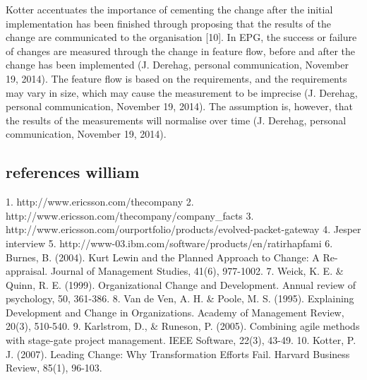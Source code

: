 \documentclass[final_report_innit.tex]{subfiles}
\begin{document}
Kotter accentuates the importance of cementing the change after the initial implementation has been finished through proposing that the results of the change are communicated to the organisation [10]. In EPG, the success or failure of changes are measured through the change in feature flow, before and after the change has been implemented (J. Derehag, personal communication, November 19, 2014). The feature flow is based on the requirements, and the requirements may vary in size, which may cause the measurement to be imprecise (J. Derehag, personal communication, November 19, 2014). The assumption is, however, that the results of the measurements will normalise over time (J. Derehag, personal communication, November 19, 2014).   


\subsection*{references william}

1. http://www.ericsson.com/thecompany 
2. http://www.ericsson.com/thecompany/company\_facts 
3. http://www.ericsson.com/ourportfolio/products/evolved-packet-gateway 
4. Jesper interview 
5. http://www-03.ibm.com/software/products/en/ratirhapfami 
6. Burnes, B. (2004). Kurt Lewin and the Planned Approach to Change: A Re-appraisal. Journal of Management Studies, 41(6), 977-1002.
7. Weick, K. E. \& Quinn, R. E. (1999). Organizational Change and Development. Annual review of psychology, 50, 361-386. 
8. Van de Ven, A. H. \& Poole, M. S. (1995). Explaining Development and Change in Organizations. Academy of Management Review, 20(3), 510-540. 
9. Karlstrom, D., \& Runeson, P. (2005). Combining agile methods with stage-gate project management. IEEE Software, 22(3), 43-49.
10. Kotter, P. J. (2007). Leading Change: Why Transformation Efforts Fail. Harvard Business Review, 85(1), 96-103.
\end{document}
